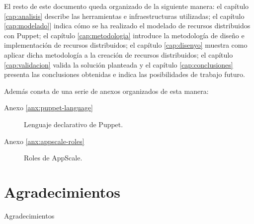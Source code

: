 El resto de este documento queda organizado de la siguiente manera: el capítulo \ref{cap:analisis} describe las herramientas e infraestructuras utilizadas; el capítulo \ref{cap:modelado}] indica cómo se ha realizado el modelado de recursos distribuidos con Puppet; el capítulo \ref{cap:metodologia} introduce la metodología de diseño e implementación de recursos distribuidos; el capítulo \ref{cap:disenyo} muestra como aplicar dicha metodología a la creación de recursos distribuidos; el capítulo \ref{cap:validacion} valida la solución planteada y el capítulo \ref{cap:conclusiones} presenta las conclusiones obtenidas e indica las posibilidades de trabajo futuro.

Además consta de una serie de anexos organizados de esta manera:
\begin{description}
\item[Anexo \ref{anx:puppet-language}] Lenguaje declarativo de Puppet.
\item[Anexo \ref{anx:appscale-roles}] Roles de AppScale.
\end{description}


\section{Agradecimientos}

Agradecimientos






